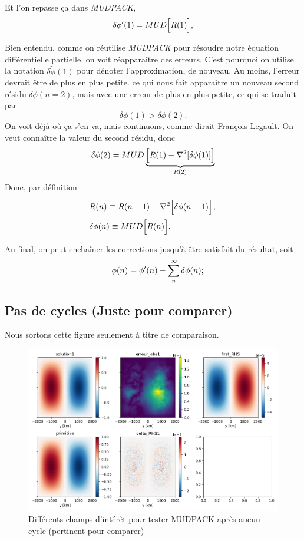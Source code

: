 \documentclass[10pt]{article}
\numberwithin{equation}{section}
\newcommand{\tall}{\vphantom{pA^{x^x}_p}}
\newcommand{\grande}{\vphantom{\frac{1}{xx}}}
\newcommand{\pt}{\hspace{1pt}} %
\newcommand{\tphi}{\tilde{\phi}}
\begin{document}
Et l'on repasse ça dans \emph{MUDPACK},
\begin{equation}
   \delta\phi'(1) = MUD\qty[\tall R(1) ],
\end{equation}


Bien entendu, comme on réutilise \emph{MUDPACK} pour résoudre notre équation différentielle partielle, on voit réapparaître des erreurs.
C'est pourquoi on utilise la notation \(\delta \tphi(1)\) pour dénoter l'approximation, de nouveau.
Au moins, l'erreur devrait être de plus en plus petite.
ce qui nous fait apparaître un nouveau second résidu \(\delta\phi(n=2)\), mais avec une erreur de plus en plus petite, ce qui se traduit par
\begin{equation}
   \delta\phi(1) > \delta\phi(2).
\end{equation}
On voit déjà où ça s'en va, mais continuons, comme dirait François Legault.
On veut connaître la valeur du second résidu, donc
\begin{equation}
   \delta \phi(2) = MUD\underbrace{\qty[R(1)\tall - \laplacian[\delta\phi(1)]]}_{R(2)}
\end{equation}
Donc, par définition
\begin{align}
   & R(n) \equiv R(n-1) - \laplacian[\delta\phi(n-1)\tall]\pt,\grande\\
   & \delta\phi(n) \equiv MUD\qty[R(n)\tall].\grande
\end{align}

Au final, on peut enchaîner les corrections jusqu'à être satisfait du résultat, soit
\begin{align}
   &\hspace{4mm}\phi(n) = \phi'(n) - \sum_n^\infty \delta\phi(n); \\
\end{align}
\subsection{Pas de cycles (Juste pour comparer)}
\label{sec:orgada2ef1}

Nous sortons cette figure seulement à titre de comparaison.

\begin{figure}[htbp]
\centering
\includegraphics[width=.9\linewidth]{figures/MUDPACK/2023-08-23_MUDPACK_test_dirichlet0.png}
\caption{\label{fig:org39b6afd}Différents champs d'intérêt pour tester MUDPACK après aucun cycle (pertinent pour comparer)}
\end{figure}
\end{document}
